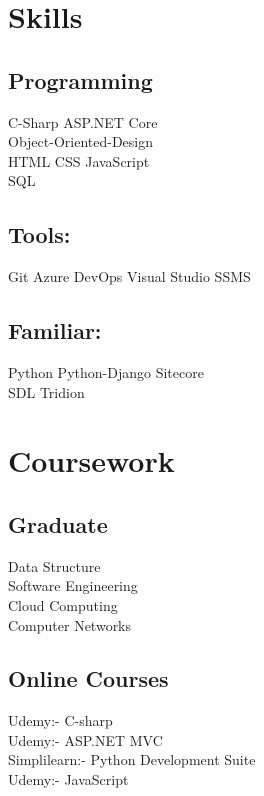 \documentclass[]{deedy-resume-openfont}
\begin{document}
\begin{minipage}[t]{0.33\textwidth}
\section{Skills}
\subsection{Programming}
\textbullet{}C-Sharp \textbullet{} ASP.NET Core\\ \textbullet{} Object-Oriented-Design\\ 
\textbullet{} HTML \textbullet{}CSS \textbullet{} JavaScript\\ 
\textbullet{} SQL  \\ 
\sectionsep
\subsection{Tools:}
\textbullet{}Git \textbullet{}Azure DevOps \textbullet{}Visual Studio \textbullet{}SSMS
\sectionsep
\subsection{Familiar:}
\textbullet{}Python \textbullet{} Python-Django \textbullet{} Sitecore\\
\textbullet{} SDL Tridion
\sectionsep


\section{Coursework}
\subsection{Graduate}
Data Structure\\
Software Engineering \\
Cloud Computing \\
Computer Networks \\
\sectionsep

\subsection{Online Courses}
Udemy:- C-sharp\\
Udemy:- ASP.NET MVC \\
Simplilearn:- Python Development Suite \\
Udemy:- JavaScript \\

%
%

\end{minipage} 
\end{document}
